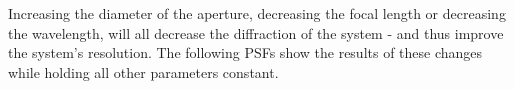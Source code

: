 Increasing the diameter of the aperture, decreasing the focal length or decreasing the wavelength, will all decrease the diffraction of the system - and thus improve the system's resolution.  The following PSFs show the results of these changes while holding all other parameters constant.  

\begin{figure}[H]
    \hfill
	 \\
   	
   	\hfill
	\\
   	

\end{figure}
